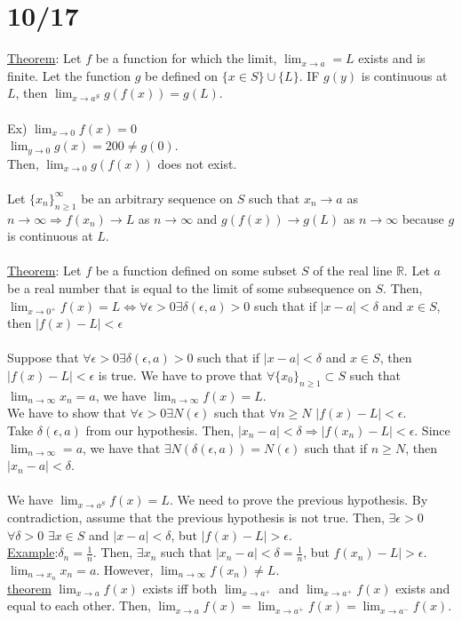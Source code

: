 \documentclass[11pt]{article}
\begin{document}
\section*{10/17}
	\underline{Theorem}: Let $f$ be a function for which the limit, 
	$\lim_{x \to a} = L$ exists and is finite. Let the function $g$ be 
	defined on $\{ x \in S\} \cup \{L\}$. IF $g(y)$ is continuous at $L$, then
	$\lim_{x \to a^S}{g(f(x))} = g(L)$.\\\\
	Ex) $\lim_{x \to 0}{f(x)} = 0$\\
	$\lim_{y \to 0}{g(x)} = 200 \not= g(0)$.\\
	Then, $\lim_{x \to 0}{g(f(x))}$ does not exist.\\\\
	Let $\{ x_n\}_{n \ge 1}^{\infty}$ be an arbitrary sequence on $S$ such that
	$x_n \to a$ as $n \to \infty \Rightarrow f(x_n) \to L$ as $n \to \infty$
	and $g(f(x)) \to g(L)$ as $n \to \infty$ because $g$ is continuous at 
	$L$.\\\\
	\underline{Theorem}: Let $f$ be a function defined on some subset $S$ of
	the real line $\mathbb{R}$. Let $a$ be a real number that is equal to the
	limit of some subsequence on $S$. Then, $\lim_{x \to 0^+}{f(x)} = L 
	\Leftrightarrow \forall \epsilon > 0 \exists \delta(\epsilon, a) > 0$ 
	such that if $|x - a| < \delta$ and $x \in S$, then $|f(x) - L|< \epsilon$\\\\
	Suppose that $\forall \epsilon > 0 \exists \delta(\epsilon, a) > 0$ 
	such that if $|x - a| < \delta$ and $x \in S$, then $|f(x) - L|< \epsilon$
	is true. We have to prove that $\forall\{x_0\}_{n \ge 1} \subset S$ such
	that $\lim_{n \to \infty}{x_n} = a$, we have $\lim_{n \to \infty}{f(x)} 
	= L$.\\
	We have to show that $\forall \epsilon > 0 \exists N(\epsilon)$ such that
	$\forall n \ge N$ $|f(x) - L| < \epsilon$.\\
	Take $\delta(\epsilon, a)$ from our hypothesis. Then, $|x_n - a| < \delta
	\Rightarrow |f(x_n) - L| < \epsilon$. Since $\lim_{n \to \infty} = a$,
	we have that $\exists N(\delta(\epsilon, a)) = N(\epsilon)$ such that
	if $n \ge N$, then $|x_n - a| < \delta$. \\\\
	We have $\lim_{x \to a^S}{f(x)} = L$. We need to prove the previous
	hypothesis. By contradiction, assume that the previous hypothesis
	is not true. Then, $\exists \epsilon > 0$ $\forall \delta > 0$ $\exists x
	\in S$ and $|x - a| < \delta$, but $|f(x)-L| > \epsilon$.\\
	\underline{Example}:$\delta_n = \frac{1}{n}$. Then, $\exists x_n$ such
	that $|x_n - a| < \delta = \frac{1}{n}$, but $f(x_n) - L | > \epsilon$.
	$\lim_{n \to x_n}x_n = a.$ However, $\lim_{n \to \infty}f(x_n) \not=
	L$. \\
	\underline{theorem} $\lim_{x \to a}{f(x)}$ exists iff both $\lim_{x \to
	a^+}$ and $\lim_{x \to a^+}f(x)$ exists and equal to each other. Then,
	$\lim_{x \to a} f(x) = \lim_{x \to a^+} f(x) = \lim_{x \to a^-}f(x)$.
\end{document}
